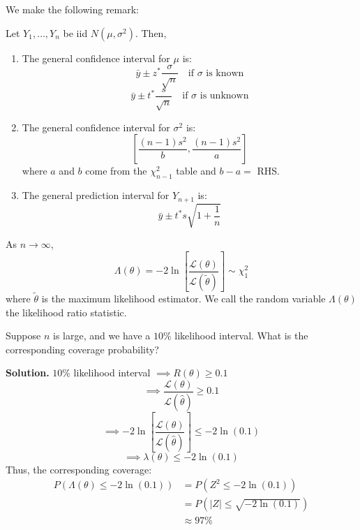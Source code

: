We make the following remark:
\begin{Remark}{}{} Let $ Y_1,\ldots ,Y_{n} $ be iid $ N(\mu,\sigma^2) $. Then,
    \begin{enumerate}[label=(\roman*)]
        \item The general confidence interval for $ \mu $ is:
              \[ \bar{y}\pm z^* \frac{\sigma}{\sqrt{n}} \quad\text{if $\sigma$ is known} \]
              \[ \bar{y}\pm t^* \frac{s}{\sqrt{n}} \quad\text{if $\sigma$ is unknown} \]
        \item The general confidence interval for $ \sigma^2 $ is:
              \[ \left[ \frac{(n-1)s^2}{b} ,\frac{(n-1)s^2}{a} \right] \]
              where $ a $ and $ b $ come from the $ \chi^2_{n-1} $ table
              and $ b-a= $ RHS\@.
        \item The general prediction interval for $ Y_{n+1} $ is:
              \[ \bar{y}\pm t^* s \sqrt{1+\frac{1}{n}} \]
    \end{enumerate}
\end{Remark}


\begin{Theorem}{}{}
    As $ n\to \infty $,
    \[ \Lambda(\theta)=-2\ln\left[  \frac{\mathcal{L}(\theta)}{\mathcal{L}(\tilde{\theta})} \right] \sim \chi^2_1  \]
    where $ \tilde{\theta} $ is the maximum likelihood estimator. We call the random
    variable $ \Lambda(\theta) $ the likelihood ratio statistic.
\end{Theorem}



\begin{Example}{}{}
    Suppose $ n $ is large, and we have a $ 10\% $ likelihood interval. What is the corresponding
    coverage probability?

    \textbf{Solution.} $ 10\% $ likelihood interval $ \implies R(\theta)\geqslant 0.1 $
    \[ \implies \frac{\mathcal{L}(\theta)}{\mathcal{L}(\hat{\theta})}\geqslant 0.1  \]
    \[ \implies -2\ln\left[  \frac{\mathcal{L}(\theta)}{\mathcal{L}(\hat{\theta})} \right]\leqslant -2\ln(0.1)  \]
    \[ \implies \lambda(\theta)\leqslant -2\ln(0.1) \]
    Thus, the corresponding coverage:
    \begin{align*}
        P(\Lambda(\theta)\leqslant -2\ln(0.1))
         & = P(Z^2\leqslant -2\ln(0.1))        \\
         & = P(|Z|\leqslant \sqrt{-2\ln(0.1)}) \\
         & \approx 97\%
    \end{align*}
\end{Example}

